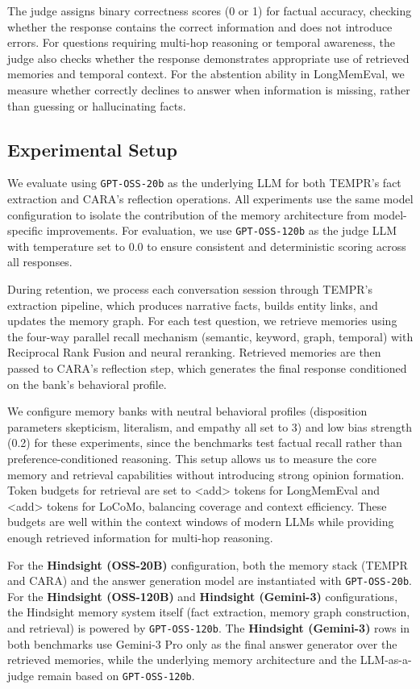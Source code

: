 The judge assigns binary correctness scores (0 or 1) for factual accuracy, checking whether the response contains the correct information and does not introduce errors. For questions requiring multi-hop reasoning or temporal awareness, the judge also checks whether the response demonstrates appropriate use of retrieved memories and temporal context. For the abstention ability in LongMemEval, we measure whether \our correctly declines to answer when information is missing, rather than guessing or hallucinating facts.

\subsection{Experimental Setup}

We evaluate \our using \texttt{GPT-OSS-20b} as the underlying LLM for both TEMPR's fact extraction and CARA's reflection operations. All experiments use the same model configuration to isolate the contribution of the memory architecture from model-specific improvements. For evaluation, we use \texttt{GPT-OSS-120b} as the judge LLM with temperature set to 0.0 to ensure consistent and deterministic scoring across all responses.


During retention, we process each conversation session through TEMPR's extraction pipeline, which produces narrative facts, builds entity links, and updates the memory graph. For each test question, we retrieve memories using the four-way parallel recall mechanism (semantic, keyword, graph, temporal) with Reciprocal Rank Fusion and neural reranking. Retrieved memories are then passed to CARA's reflection step, which generates the final response conditioned on the bank's behavioral profile.

We configure memory banks with neutral behavioral profiles (disposition parameters skepticism, literalism, and empathy all set to 3) and low bias strength (0.2) for these experiments, since the benchmarks test factual recall rather than preference-conditioned reasoning. This setup allows us to measure the core memory and retrieval capabilities without introducing strong opinion formation. Token budgets for retrieval are set to <add> tokens for LongMemEval and <add> tokens for LoCoMo, balancing coverage and context efficiency. These budgets are well within the context windows of modern LLMs while providing enough retrieved information for multi-hop reasoning.

For the \textbf{Hindsight (OSS-20B)} configuration, both the memory stack (TEMPR and CARA) and the answer generation model are instantiated with \texttt{GPT-OSS-20b}. For the \textbf{Hindsight (OSS-120B)} and \textbf{Hindsight (Gemini-3)} configurations, the Hindsight memory system itself (fact extraction, memory graph construction, and retrieval) is powered by \texttt{GPT-OSS-120b}. The \textbf{Hindsight (Gemini-3)} rows in both benchmarks use Gemini-3 Pro only as the final answer generator over the retrieved memories, while the underlying memory architecture and the LLM-as-a-judge remain based on \texttt{GPT-OSS-120b}.

